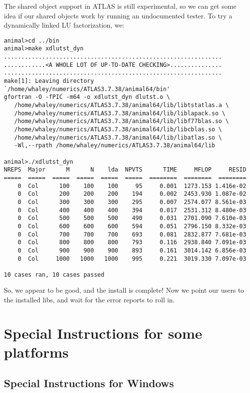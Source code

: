 \documentclass[11pt]{article}
\begin{document}
The shared object support in ATLAS is still experimental, so we
can get some idea if our shared objects work by running an undocumented
tester.  To try a dynamically linked LU factorization, we:
\begin{footnotesize}
\begin{verbatim}
animal>cd ../bin
animal>make xdlutst_dyn
...............................................................
............<A WHOLE LOT OF UP-TO-DATE CHECKING>...............
...............................................................
make[1]: Leaving directory `/home/whaley/numerics/ATLAS3.7.38/animal64/bin'
gfortran -O -fPIC -m64 -o xdlutst_dyn dlutst.o \
   /home/whaley/numerics/ATLAS3.7.38/animal64/lib/libtstatlas.a \
   /home/whaley/numerics/ATLAS3.7.38/animal64/lib/liblapack.so \
   /home/whaley/numerics/ATLAS3.7.38/animal64/lib/libf77blas.so \
   /home/whaley/numerics/ATLAS3.7.38/animal64/lib/libcblas.so \
   /home/whaley/numerics/ATLAS3.7.38/animal64/lib/libatlas.so \
   -Wl,--rpath /home/whaley/numerics/ATLAS3.7.38/animal64/lib

animal>./xdlutst_dyn
NREPS  Major      M      N    lda  NPVTS      TIME     MFLOP     RESID
=====  =====  =====  =====  =====  =====  ========  ========  ========
    0  Col      100    100    100     95     0.001  1273.153 1.416e-02
    0  Col      200    200    200    194     0.002  2453.930 1.087e-02
    0  Col      300    300    300    295     0.007  2574.077 8.561e-03
    0  Col      400    400    400    394     0.017  2531.312 8.480e-03
    0  Col      500    500    500    490     0.031  2701.090 7.610e-03
    0  Col      600    600    600    594     0.051  2796.150 8.332e-03
    0  Col      700    700    700    693     0.081  2832.877 7.681e-03
    0  Col      800    800    800    793     0.116  2938.840 7.091e-03
    0  Col      900    900    900    893     0.161  3014.142 6.856e-03
    0  Col     1000   1000   1000    995     0.221  3019.330 7.097e-03

10 cases ran, 10 cases passed
\end{verbatim}
\end{footnotesize}
So, we appear to be good, and the install is complete!  Now we point our
users to the installed libs, and wait for the error reports to roll in.

\section{Special Instructions for some platforms}
\subsection{Special Instructions for Windows}
\label{sec-windows}
\end{document}
